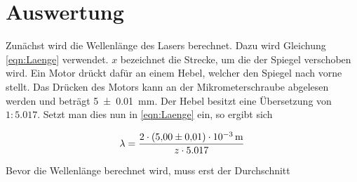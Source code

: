 


\section{Auswertung}
\label{sec:Auswertung}

Zunächst wird die Wellenlänge des Lasers berechnet. Dazu wird Gleichung \eqref{eqn:Laenge} verwendet. 
$x$ bezeichnet die Strecke, um die der Spiegel verschoben wird. Ein Motor drückt dafür an einem Hebel, 
welcher den Spiegel nach vorne stellt. Das Drücken des Motors kann an der Mikrometerschraube abgelesen 
werden und beträgt \qty{5\pm0.01}{\milli \meter}. Der Hebel besitzt eine Übersetzung von $1:5.017$. Setzt man 
dies nun in \eqref{eqn:Laenge} ein, so ergibt sich 

\begin{equation}
    \label{eqn:Wellenlaenge}
    \lambda = \frac{2 \cdot \qty{5\pm0.01e-3}{\meter} }{z \cdot 5.017}
\end{equation}

\noindent Bevor die Wellenlänge berechnet wird, muss erst der Durchschnitt


